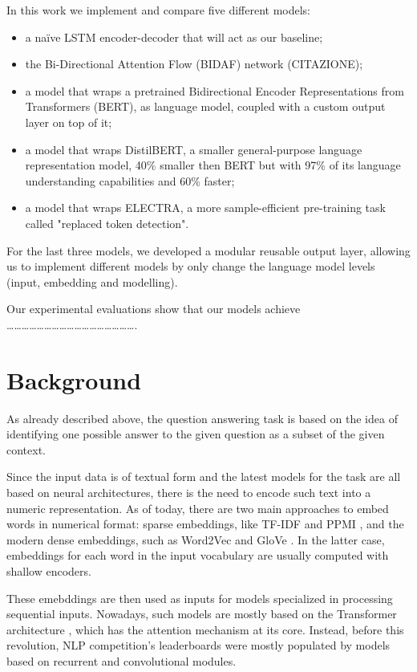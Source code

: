 \documentclass[a4paper,10pt]{report}
\begin{document}
In this work we implement and compare five different models: 
\begin{itemize}
  \item a naïve LSTM encoder-decoder that will act as our baseline;
  \item the Bi-Directional Attention Flow (BIDAF) network (CITAZIONE);
  \item a model that wraps a pretrained Bidirectional Encoder Representations from Transformers (BERT), as language model, coupled with a custom output layer on top of it;
  \item a model that wraps DistilBERT, a smaller general-purpose language representation model, 40\% smaller then BERT but with 97\% of its language understanding capabilities and 60\% faster;
  \item a model that wraps ELECTRA, a more sample-efficient pre-training task called "replaced token detection".

\end{itemize}
For the last three models, we developed a modular reusable output layer, allowing us to implement different models by only change the language model levels (input, embedding and modelling).

Our experimental evaluations show that our models achieve …………………………………………….

\chapter{Background}\label{chap:background}

As already described above, the question answering task is based on the idea of identifying one possible answer to the given question as a subset of the given context. 

Since the input data is of textual form and the latest models for the task are all based on neural architectures, there is the need to encode such text into a numeric representation. As of today, there are two main approaches to embed words in numerical format: sparse embeddings, like TF-IDF \cite{tf-idf} and PPMI \cite{ppmi}, and the modern dense embeddings, such as Word2Vec \cite{word2vec} and GloVe \cite{glove}. In the latter case, embeddings for each word in the input vocabulary are usually computed with shallow encoders. 

These emebddings are then used as inputs for models specialized in processing sequential inputs. Nowadays, such models are mostly based on the Transformer architecture \cite{transformers}, which has the attention mechanism at its core. Instead, before this revolution, NLP competition's leaderboards were mostly populated by models based on recurrent and convolutional modules.
\end{document}
